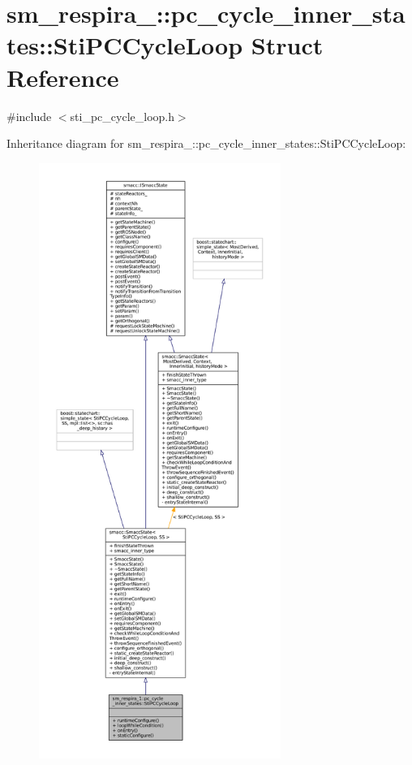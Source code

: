 \hypertarget{structsm__respira__1_1_1pc__cycle__inner__states_1_1StiPCCycleLoop}{}\section{sm\+\_\+respira\+\_\+:\+:pc\+\_\+cycle\+\_\+inner\+\_\+states\+:\+:Sti\+P\+C\+Cycle\+Loop Struct Reference}
\label{structsm__respira__1_1_1pc__cycle__inner__states_1_1StiPCCycleLoop}


{\ttfamily \#include $<$sti\+\_\+pc\+\_\+cycle\+\_\+loop.\+h$>$}



Inheritance diagram for sm\+\_\+respira\+\_\+:\+:pc\+\_\+cycle\+\_\+inner\+\_\+states\+:\+:Sti\+P\+C\+Cycle\+Loop\+:
\nopagebreak
\begin{figure}[H]
\begin{center}
\leavevmode
\includegraphics[height=550pt]{structsm__respira__1_1_1pc__cycle__inner__states_1_1StiPCCycleLoop__inherit__graph}
\end{center}
\end{figure}


